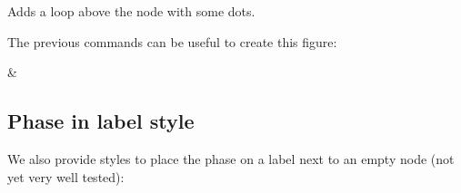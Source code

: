 \documentclass[a4paper]{ltxdoc}
\begin{document}
\begin{command}{\zxLoopAboveDots{}}
  Adds a loop above the node with some dots.
\begin{codeexample}[width=3cm]
\begin{ZX}
  \zxX{\alpha} \zxLoopAboveDots{}
\end{ZX}
\end{codeexample}
\end{command}

\noindent The previous commands can be useful to create this figure:
\begin{codeexample}[width=0pt]%
\begin{ZX}
   \zxX{\alpha} \zxLoopAboveDots{} \middleManyDots{} \ar[r,o'=60]
      & \zxX{\beta} \zxLoopAboveDots{} 
\end{ZX}
\end{codeexample}

\subsection{Phase in label style}

We also provide styles to place the phase on a label next to an empty node (not yet very well tested):
\end{document}
